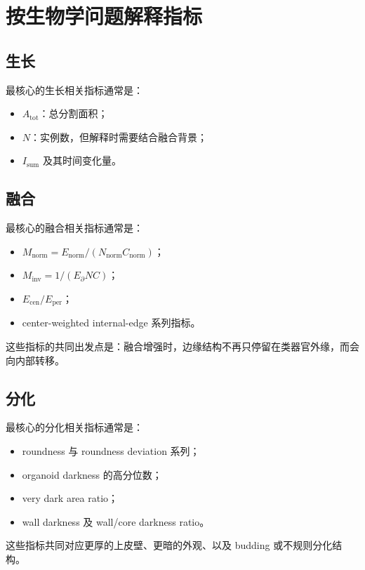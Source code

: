 \documentclass[11pt]{article}
\newcommand{\1}{\mathbf{1}}
\begin{document}
\section{按生物学问题解释指标}
\subsection{生长}
最核心的生长相关指标通常是：
\begin{itemize}[leftmargin=1.5em]
  \item $A_{\mathrm{tot}}$：总分割面积；
  \item $N$：实例数，但解释时需要结合融合背景；
  \item $I_{\mathrm{sum}}$ 及其时间变化量。
\end{itemize}

\subsection{融合}
最核心的融合相关指标通常是：
\begin{itemize}[leftmargin=1.5em]
  \item $M_{\mathrm{norm}} = E_{\mathrm{norm}}/(N_{\mathrm{norm}}C_{\mathrm{norm}})$；
  \item $M_{\mathrm{inv}} = 1/(E_{\partial}NC)$；
  \item $E_{\mathrm{cen}}/E_{\mathrm{per}}$；
  \item center-weighted internal-edge 系列指标。
\end{itemize}

这些指标的共同出发点是：融合增强时，边缘结构不再只停留在类器官外缘，而会向内部转移。

\subsection{分化}
最核心的分化相关指标通常是：
\begin{itemize}[leftmargin=1.5em]
  \item roundness 与 roundness deviation 系列；
  \item organoid darkness 的高分位数；
  \item very dark area ratio；
  \item wall darkness 及 wall/core darkness ratio。
\end{itemize}

这些指标共同对应更厚的上皮壁、更暗的外观、以及 budding 或不规则分化结构。
\end{document}
